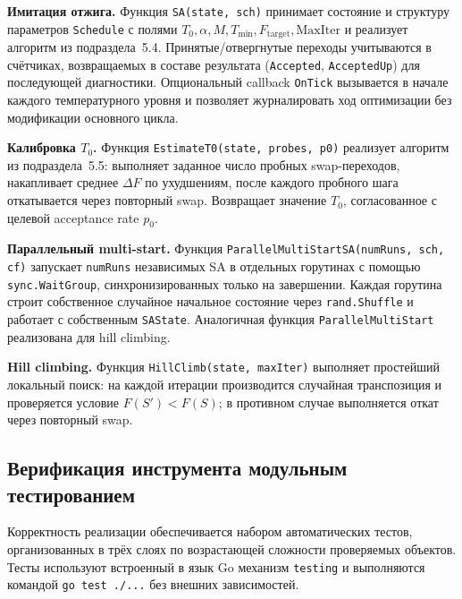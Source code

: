 \textbf{Имитация отжига.} Функция \texttt{SA(state, sch)} принимает
состояние и структуру параметров \texttt{Schedule} с полями
$T_0, \alpha, M, T_{\min}, F_{\mathrm{target}}, \mathrm{MaxIter}$
и реализует алгоритм из подраздела~5.4. Принятые/отвергнутые
переходы учитываются в счётчиках, возвращаемых в составе
результата (\texttt{Accepted}, \texttt{AcceptedUp}) для последующей
диагностики. Опциональный callback \texttt{OnTick} вызывается в
начале каждого температурного уровня и позволяет журналировать
ход оптимизации без модификации основного цикла.

\textbf{Калибровка $T_0$.} Функция \texttt{EstimateT0(state, probes, p0)}
реализует алгоритм из подраздела~5.5: выполняет заданное число
пробных swap-переходов, накапливает среднее $\Delta F$ по
ухудшениям, после каждого пробного шага откатывается через
повторный swap. Возвращает значение $T_0$, согласованное с
целевой acceptance rate $p_0$.

\textbf{Параллельный multi-start.} Функция
\texttt{ParallelMultiStartSA(numRuns, sch, cf)} запускает
\texttt{numRuns} независимых SA в отдельных горутинах с помощью
\texttt{sync.WaitGroup}, синхронизированных только на завершении.
Каждая горутина строит собственное случайное начальное состояние
через \texttt{rand.Shuffle} и работает с собственным
\texttt{SAState}. Аналогичная функция \texttt{ParallelMultiStart}
реализована для hill climbing.

\textbf{Hill climbing.} Функция \texttt{HillClimb(state, maxIter)}
выполняет простейший локальный поиск: на каждой итерации
производится случайная транспозиция и проверяется условие
$F(S') < F(S)$; в противном случае выполняется откат через
повторный swap.

\subsection{Верификация инструмента модульным тестированием}

Корректность реализации обеспечивается набором автоматических
тестов, организованных в трёх слоях по возрастающей сложности
проверяемых объектов. Тесты используют встроенный в язык Go
механизм \texttt{testing} и выполняются командой \texttt{go test ./...}
без внешних зависимостей.

